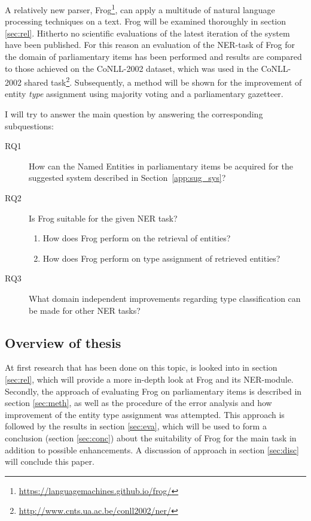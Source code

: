 A relatively new parser, Frog\footnote{\url{https://languagemachines.github.io/frog/}},   can apply a multitude of natural language processing techniques on a text. Frog will be examined thoroughly in section \ref{sec:rel}. Hitherto no scientific evaluations of the latest iteration of the system have been published. For this reason an evaluation of  the NER-task of Frog for the domain of parliamentary items has been performed and results are compared to those achieved on the CoNLL-2002 dataset, which was used in the CoNLL-2002 shared task\footnote{\url{http://www.cnts.ua.ac.be/conll2002/ner/}}. Subsequently, a method will be shown for the improvement of entity \textit{type} assignment using majority voting and a parliamentary gazetteer.

I will try to answer the main question by answering the corresponding subquestions:
\begin{description}
\item[RQ1]How can the Named Entities in parliamentary items be acquired for the suggested system described in Section~\ref{app:sug_sys}? 
\item[RQ2] Is Frog suitable for the given NER task?
\begin{enumerate}
\item How does Frog perform on the retrieval of entities?
\item How does Frog perform on type assignment of retrieved entities?
\end{enumerate}
\item[RQ3] What domain independent improvements regarding type classification can be made for other NER tasks?
\end{description}

\subsection{Overview of thesis}
At first research that has been done on this topic, is looked into in section \ref{sec:rel}, which will provide a more in-depth look at Frog and its NER-module. Secondly, the approach of evaluating Frog on parliamentary items is described in section \ref{sec:meth}, as well as the procedure of the error analysis and how improvement of the entity type assignment was attempted. This approach is followed by the results in section \ref{sec:eva}, which will be used to form a conclusion (section \ref{sec:conc}) about the suitability of Frog for the main task in addition to possible enhancements. A discussion of approach in section \ref{sec:disc} will conclude this paper.
